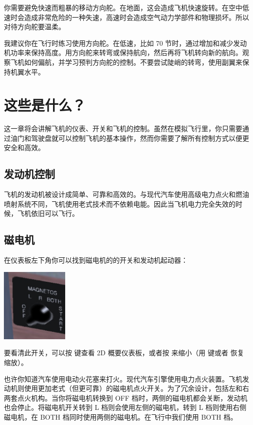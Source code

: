你需要避免快速而粗暴的移动方向舵。在地面，这会造成飞机快速旋转。在空中低速时会造成非常危险的一种失速，高速时会造成空气动力学部件和物理损坏。所以对待方向舵要温柔。

我建议你在飞行时练习使用方向舵。在低速，比如 70 节时，通过增加和减少发动机功率来保持高度。用方向舵来转弯或保持航向，然后再将飞机转向新的航向。观察飞机如何偏航，并学习预判方向舵的控制。不要尝试陡峭的转弯，使用副翼来保持机翼水平。

\section{这些是什么？}

这一章将会讲解飞机的仪表、开关和飞机的控制。虽然在模拟飞行里，你只需要通过油门和驾驶盘就可以控制飞机的基本操作，然而你需要了解所有控制方式以便更安全和高效。

\subsection{发动机控制}
\label{sec:EngineControl}

飞机的发动机被设计成简单、可靠和高效的。与现代汽车使用高级电力点火和燃油喷射系统不同，飞机使用老式技术而不依赖电能。因此当飞机电力完全失效的时候，飞机依旧可以飞行。

\subsection*{磁电机}

在仪表板左下角你可以找到磁电机的的开关和发动机起动器：

\begin{center}
\includegraphics[width=0.25\textwidth]{img/tut_28}
\end{center}

要看清此开关，可以按  键查看 2D 概要仪表板，或者按  来缩小（用  键或者  恢复缩放）。

也许你知道汽车使用电动火花塞来打火。现代汽车引擎使用电力点火装置。飞机发动机则使用更加老式（但更可靠）的磁电机点火开关。为了冗余设计，包括左和右两套点火机构。当你将磁电机转换到 OFF 档时，两侧的磁电机都会关断，发动机也会停止。将磁电机开关转到 L 档则会使用左侧的磁电机，转到 L 档则使用右侧磁电机，在 BOTH 档同时使用两侧的磁电机。在飞行中我们使用 BOTH 档。

